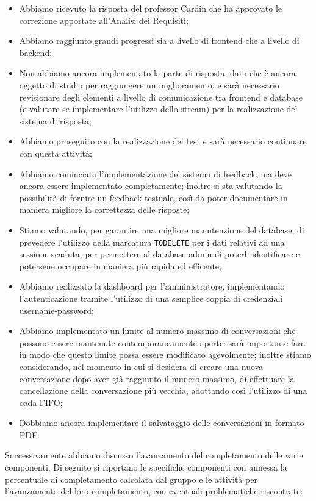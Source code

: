 \begin{itemize}
    \item Abbiamo ricevuto la risposta del professor Cardin che ha approvato le correzione apportate all'Analisi dei Requisiti;
    \item Abbiamo raggiunto grandi progressi sia a livello di frontend che a livello di backend;
    \item Non abbiamo ancora implementato la parte di risposta, dato che è ancora oggetto di studio per raggiungere un miglioramento, e sarà necessario revisionare degli elementi a livello di comunicazione tra frontend e database (e valutare se implementare l'utilizzo dello stream) per la realizzazione del sistema di risposta;
    \item Abbiamo proseguito con la realizzazione dei test e sarà necessario continuare con questa attività;
    \item Abbiamo cominciato l'implementazione del sistema di feedback, ma deve ancora essere implementato completamente; inoltre si sta valutando la possibilità di fornire un feedback testuale, così da poter documentare in maniera migliore la correttezza delle risposte;
    \item Stiamo valutando, per garantire una migliore manutenzione del database, di prevedere l'utilizzo della marcatura \texttt{TODELETE} per i dati relativi ad una sessione scaduta, per permettere al database admin di poterli identificare e potersene occupare in maniera più rapida ed efficente;
    \item Abbiamo realizzato la dashboard per l'amministratore, implementando l'autenticazione tramite l'utilizzo di una semplice coppia di credenziali username-password;
    \item Abbiamo implementato un limite al numero massimo di conversazioni che possono essere mantenute contemporaneamente aperte: sarà importante fare in modo che questo limite possa essere modificato agevolmente; inoltre stiamo considerando, nel momento in cui si desidera di creare una nuova conversazione dopo aver già raggiunto il numero massimo, di effettuare la cancellazione della conversazione più vecchia, adottando così l'utilizzo di una coda FIFO;
    \item Dobbiamo ancora implementare il salvataggio delle conversazioni in formato PDF.
\end{itemize}
Successivamente abbiamo discusso l'avanzamento del completamento delle varie componenti. Di seguito si riportano le specifiche componenti con annessa la percentuale di completamento calcolata dal gruppo e le attività per l'avanzamento del loro completamento, con eventuali problematiche riscontrate:
